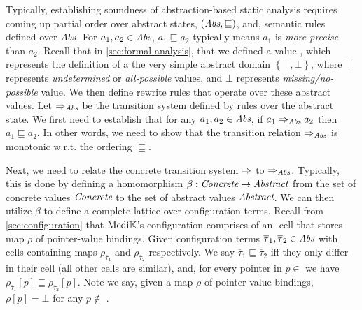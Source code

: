 Typically, establishing soundness of abstraction-based static analysis
requires coming up partial order over abstract states,
$\left(\textit{Abs}, \sqsubseteq\right)$, and, semantic rules defined over $\textit{Abs}$.
For $a_1, a_2 \in \textit{Abs}$, $a_1 \sqsubseteq a_2$ typically means $a_1$ is
\emph{more precise} than $a_2$. Recall that in \autoref{sec:formal-analysis},
that we defined a value , which represents the definition of a
the very simple abstract
domain $\left\{\top,\bot\right\}$, where $\top$ represents
\emph{undetermined} or \emph{all-possible} values, and $\bot$ represents
\emph{missing/no-possible} value. We then define rewrite rules
that operate over these abstract values. Let $\Rightarrow_{\textit{Abs}}$ be the transition
system defined by rules over the abstract state. We first need to
establish that for any $a_1, a_2 \in \textit{Abs}$, if $a_1 \Rightarrow_{\textit{Abs}} a_2$ then $a_1
\sqsubseteq a_2$. In other words, we need to show that the transition relation
$\Rightarrow_{\textit{Abs}}$ is monotonic w.r.t. the ordering $\sqsubseteq$.

Next, we need to relate the concrete transition system $\Rightarrow$ to $\Rightarrow_{\textit{Abs}}$.
Typically, this is done by defining a homomorphism $\beta: \textit{Concrete} \to \textit{Abstract}$
from the set of concrete values $\textit{Concrete}$ to the set of abstract values
$\textit{Abstract}$. We can then utilize $\beta$ to define a complete lattice over
configuration terms. Recall from \autoref{sec:configuration} that
$\text{Medi}\mathbb{K}{}{}$'s configuration comprises of an -cell that
stores map $\rho$ of pointer-value bindings.
Given configuration terms $\overline{\tau}_1, \overline{\tau}_2 \in
\textit{Abs}$ with  cells containing maps $\rho_{\overline{\tau}_1}$ and
$\rho_{\overline{\tau}_2}$ respectively.
We say $\overline{\tau}_1 \sqsubseteq \overline{\tau}_2$ iff
they only differ in their
 cell (all other cells are similar), and, for every
pointer in $p \in$ 
we have $\rho_{\overline{\tau}_1}[p] \sqsubseteq \rho_{\overline{\tau}_2}[p]$. Note we
say, given a map $\rho$ of pointer-value bindings,
$\rho[p] = \bot$ for any $p \not\in$ .

